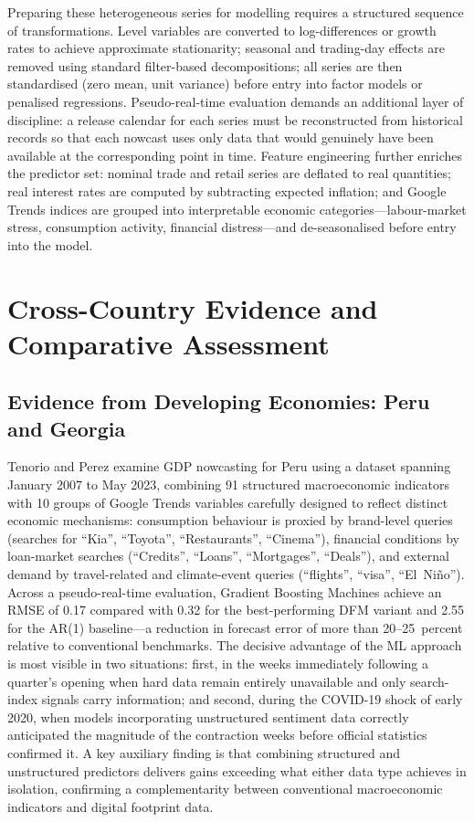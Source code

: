 \documentclass[12pt,a4paper]{report}
\begin{document}
Preparing these heterogeneous series for modelling requires a structured
sequence of transformations. Level variables are converted to
log-differences or growth rates to achieve approximate stationarity;
seasonal and trading-day effects are removed using standard filter-based
decompositions; all series are then standardised (zero mean, unit
variance) before entry into factor models or penalised regressions.
Pseudo-real-time evaluation demands an additional layer of discipline: a
release calendar for each series must be reconstructed from historical
records so that each nowcast uses only data that would genuinely have
been available at the corresponding point in time.\citep{Anesti2020}
Feature engineering further enriches the predictor set: nominal trade
and retail series are deflated to real quantities; real interest rates
are computed by subtracting expected inflation; and Google Trends
indices are grouped into interpretable economic categories---labour-market
stress, consumption activity, financial distress---and de-seasonalised
before entry into the model.\citep{US2022}

\chapter{Cross-Country Evidence and Comparative Assessment}

\section{Evidence from Developing Economies: Peru and Georgia}

Tenorio and Perez examine GDP nowcasting for Peru using a dataset
spanning January 2007 to May 2023, combining 91 structured
macroeconomic indicators with 10 groups of Google Trends variables
carefully designed to reflect distinct economic mechanisms: consumption
behaviour is proxied by brand-level queries (searches for ``Kia'',
``Toyota'', ``Restaurants'', ``Cinema''), financial conditions by
loan-market searches (``Credits'', ``Loans'', ``Mortgages'',
``Deals''), and external demand by travel-related and climate-event
queries (``flights'', ``visa'', ``El~Ni\~{n}o'').\citep{Peru2024}
Across a pseudo-real-time evaluation, Gradient Boosting Machines achieve
an RMSE of 0.17 compared with 0.32 for the best-performing DFM variant
and 2.55 for the AR(1) baseline---a reduction in forecast error of
more than 20--25~percent relative to conventional benchmarks. The
decisive advantage of the ML approach is most visible in two situations:
first, in the weeks immediately following a quarter's opening when hard
data remain entirely unavailable and only search-index signals carry
information; and second, during the COVID-19 shock of early 2020, when
models incorporating unstructured sentiment data correctly anticipated
the magnitude of the contraction weeks before official statistics
confirmed it. A key auxiliary finding is that combining structured and
unstructured predictors delivers gains exceeding what either data type
achieves in isolation, confirming a complementarity between conventional
macroeconomic indicators and digital footprint data.
\end{document}
